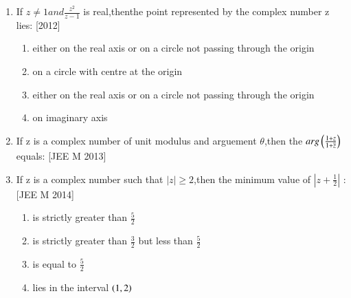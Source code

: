 \documentclass[journal,12pt,twocolumn,article]{IEEEtran}
\theoremstyle{remark}
\begin{document}
\begin{enumerate}[start = 14]
\item If $z \neq 1 and \frac{z^2}{z-1}$ is real,thenthe point represented by the complex number z lies:
\hfill{[2012]}

\begin{enumerate}

\item either on the real axis or on a circle not passing through the origin
                                   
                              
\item on a circle with centre at the origin
                             
\item either on the real axis or on a circle not passing through the origin                                                                  
\item on imaginary axis
                                   
\end{enumerate}

\item If z is a complex number of unit modulus and arguement $\theta$,then the $arg\left(\frac{1+z}{1+\overline{z}}\right)$ equals:
\hfill{[JEE M 2013]}

\begin{enumerate}
\end{enumerate}

\item If z is a complex number such that $|z|\geq 2$,then the minimum value of $|z+\frac{1}{2}|$ :     
\hfill{[JEE M 2014]}  

\begin{enumerate}
                             
\item is strictly greater than $\frac{5}{2}$       

\item is strictly greater than $\frac{3}{2}$ but less than $\frac{5}{2}$
\item is equal to $\frac{5}{2}$

\item lies in the interval $\left(1,2\right)$


\end{enumerate}
\end{enumerate}
\end{document}
